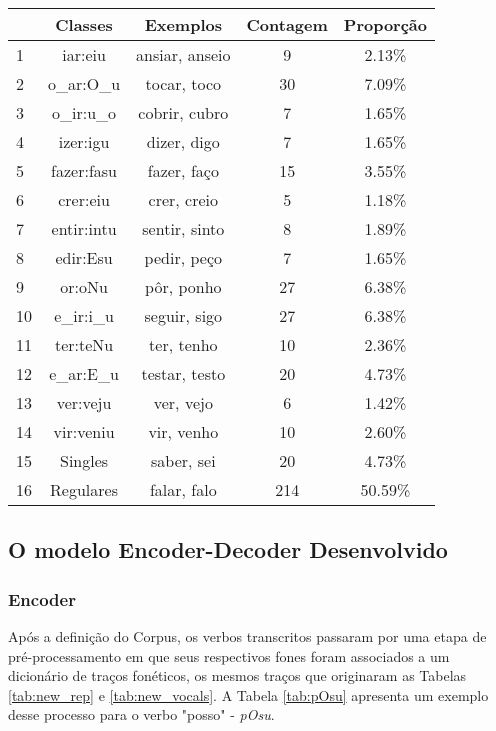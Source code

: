 \begin{table}[H]
\begin{center}
\begin{tabular}{|l|c|c|c|c|}
\toprule
& Classes & Exemplos & Contagem & Proporção\\
\midrule
1 & iar:eiu & ansiar, anseio & 9 & 2.13\%\\
2 & o\_ar:O\_u & tocar, toco & 30 & 7.09\%\\
3 & o\_ir:u\_o & cobrir, cubro & 7 & 1.65\%\\
4 & izer:igu & dizer, digo & 7 & 1.65\%\\
5 & fazer:fasu & fazer, faço & 15 & 3.55\%\\
6 & crer:eiu & crer, creio & 5 & 1.18\%\\
7 & entir:intu & sentir, sinto & 8 & 1.89\% \\
8 & edir:Esu & pedir, peço & 7 & 1.65\%\\
9 & or:oNu & pôr, ponho & 27 & 6.38\%\\
10 & e\_ir:i\_u & seguir, sigo & 27 & 6.38\%\\
11 & ter:teNu & ter, tenho & 10 & 2.36\%\\
12 & e\_ar:E\_u & testar, testo & 20 & 4.73\%\\
13 & ver:veju & ver, vejo & 6 & 1.42\%\\
14 & vir:veniu & vir, venho & 10 & 2.60\%\\
15 & Singles & saber, sei & 20 & 4.73\%\\
16 & Regulares & falar, falo & 214 & 50.59\%\\
\bottomrule
\end{tabular}
\end{center}
\label{tab:classes}
\end{table}

\subsection{O modelo Encoder-Decoder Desenvolvido}

\subsubsection{Encoder}
\label{sec:inputs}

Após a definição do Corpus, os verbos transcritos passaram por uma etapa de pré-processamento em que seus respectivos fones foram associados a um dicionário de traços fonéticos, os mesmos traços que originaram as Tabelas \ref{tab:new_rep} e \ref{tab:new_vocals}. A Tabela \ref{tab:pOsu} apresenta um exemplo desse processo para o verbo "posso" - \textit{pOsu}. 

